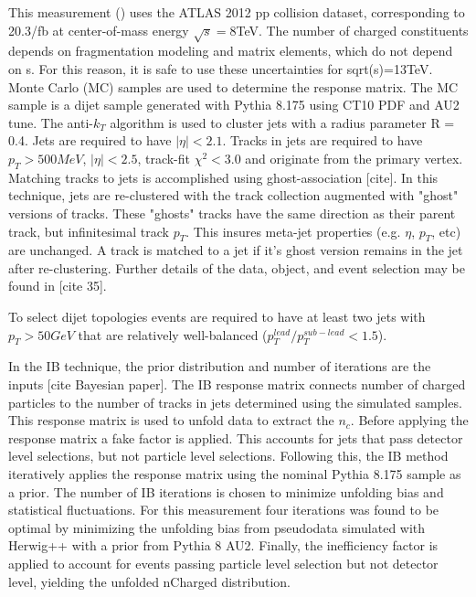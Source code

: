 This measurement (\cite{Unfolding}) uses the ATLAS 2012 pp collision dataset, corresponding to 20.3/fb at center-of-mass energy $\sqrt{s}=8$TeV. The number of charged constituents depends on fragmentation modeling and matrix elements, which do not depend on s. For this reason, it is safe to use these uncertainties for sqrt(s)=13TeV. Monte Carlo (MC) samples are used to determine the response matrix. The MC sample is a dijet sample generated with Pythia 8.175 using CT10 PDF and AU2 tune.  The anti-$k_{T}$ algorithm is used to cluster jets with a radius parameter R = 0.4. Jets are required to have $|\eta| < 2.1$. Tracks in jets are required to have $p_{T}>500MeV$, $|\eta|<2.5$, track-fit $\chi^{2} < 3.0$ and originate from the primary vertex. Matching tracks to jets is accomplished using ghost-association [cite]. In this technique, jets are re-clustered with the track collection augmented with "ghost" versions of tracks.  These "ghosts" tracks have the same direction as their parent track, but infinitesimal track $p_{T}$. This insures meta-jet properties (e.g. $\eta$, $p_{T}$, etc) are unchanged. A track is matched to a jet if it's ghost version remains in the jet after re-clustering. Further details of the data, object, and event selection may be found in [cite 35].

To select dijet topologies events are required to have at least two jets with $p_{T} > 50GeV$ that are relatively well-balanced ($p_{T}^{lead}/p_{T}^{sub-lead} < 1.5$). 

In the IB technique, the prior distribution and number of iterations are the inputs [cite Bayesian paper]. The IB response matrix connects number of charged particles to the number of tracks in jets determined using the simulated samples. This response matrix is used to unfold data to extract the $n_{c}$. Before applying the response matrix a fake factor is applied. This accounts for jets that pass detector level selections, but not particle level selections. Following this, the IB method iteratively applies the response matrix using the nominal Pythia 8.175 sample as a prior. The number of IB iterations is chosen to minimize unfolding bias and statistical fluctuations. For this measurement four iterations was found to be optimal by minimizing the unfolding bias from pseudodata simulated with Herwig++ with a prior from Pythia 8 AU2. Finally, the inefficiency factor is applied to account for events passing particle level selection but not detector level, yielding the unfolded nCharged distribution.
 
